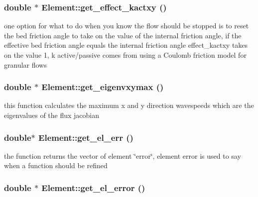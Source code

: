 \hypertarget{classElement_a120}{
\subsubsection[get\_\-effect\_\-kactxy]{\setlength{\rightskip}{0pt plus 5cm}double $\ast$ Element::get\_\-effect\_\-kactxy ()}}
\label{classElement_a120}


one option for what to do when you know the flow should be stopped is to reset the bed friction angle to take on the value of the internal friction angle, if the effective bed friction angle equals the internal friction angle effect\_\-kactxy takes on the value 1, k active/passive comes from using a Coulomb friction model for granular flows 

\hypertarget{classElement_a79}{
\subsubsection[get\_\-eigenvxymax]{\setlength{\rightskip}{0pt plus 5cm}double $\ast$ Element::get\_\-eigenvxymax ()}}
\label{classElement_a79}


this function calculates the maximum x and y direction wavespeeds which are the eigenvalues of the flux jacobian 

\hypertarget{classElement_a51}{
\subsubsection[get\_\-el\_\-err]{\setlength{\rightskip}{0pt plus 5cm}double$\ast$ Element::get\_\-el\_\-err ()}}
\label{classElement_a51}


the function returns the vector of element \char`\"{}error\char`\"{}, element error is used to say when a function should be refined 

\hypertarget{classElement_a27}{
\subsubsection[get\_\-el\_\-error]{\setlength{\rightskip}{0pt plus 5cm}double $\ast$ Element::get\_\-el\_\-error ()}}
\label{classElement_a27}


